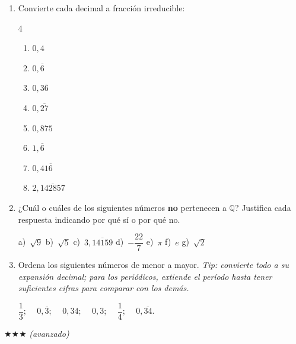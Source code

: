 \documentclass[11pt, letterpaper]{article}
\begin{document}
\begin{enumerate}[label=\textbf{\arabic*.}, leftmargin=*, resume]

\item Convierte cada decimal a fracci\'on irreducible:
\begin{multicols}{4}
\begin{enumerate}[label=\alph*)]
  \item $0{,}4$ \item $0{,}\overline{6}$ \item $0{,}3\overline{6}$ \item $0{,}\overline{27}$
  \item $0{,}875$ \item $1{,}\overline{6}$ \item $0{,}41\overline{6}$ \item $2{,}\overline{142857}$
\end{enumerate}
\end{multicols}

\item ¿Cu\'al o cu\'ales de los siguientes n\'umeros \textbf{no} pertenecen a $\mathbb{Q}$? Justifica cada respuesta indicando por qu\'e sí o por qu\'e no.

\noindent a)~$\sqrt{9}$ \quad b)~$\sqrt{5}$ \quad c)~$3{,}\overline{14159}$ \quad d)~$-\dfrac{22}{7}$ \quad e)~$\pi$ \quad f)~$e$ \quad g)~$\sqrt{2}$

\item Ordena los siguientes n\'umeros de menor a mayor. \textit{Tip: convierte todo a su expansi\'on decimal; para los peri\'odicos, extiende el per\'iodo hasta tener suficientes cifras para comparar con los dem\'as.}

\noindent $\dfrac{1}{3}$; $\quad 0{,}\overline{3}$; $\quad 0{,}34$; $\quad 0{,}3$; $\quad \dfrac{1}{4}$; $\quad 0{,}\overline{34}$.


\end{enumerate}

$\bigstar\bigstar\bigstar$ \textit{(avanzado)}
\end{document}
